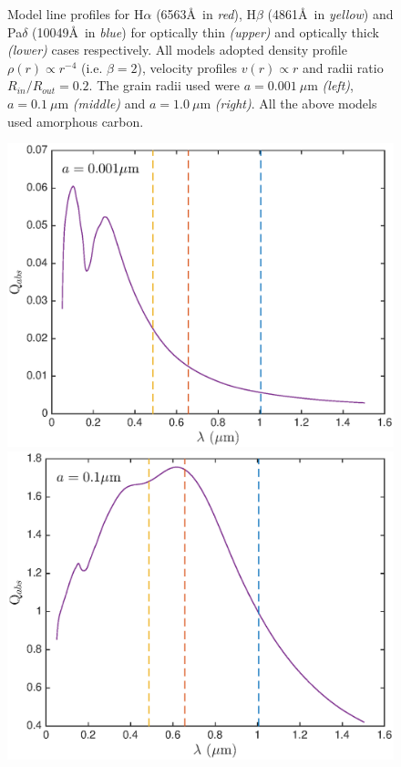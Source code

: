 \documentclass[useAMS,usenatbib,usegraphicx]{mnras}
\begin{document}
\begin{figure}
\caption{Model line profiles for H$\alpha$ (6563\AA\ in \textit{red}), H$\beta$ (4861\AA\ in \textit{yellow}) and Pa$\delta$ (10049\AA\ in \textit{blue}) for optically thin \textit{(upper)} and  optically thick \textit{(lower)} cases respectively.  All models adopted density profile $\rho(r) \propto r^{-4}$ (i.e. $\beta = 2$), velocity profiles $v(r) \propto r$ and radii ratio $R_{in}/R_{out}=0.2$.  The grain radii used were $a=0.001~\mu$m \textit{(left)}, $a=0.1~\mu$m \textit{(middle)} and $a=1.0~\mu$m \textit{(right)}. All the above models used amorphous carbon.}
\label{wav_dep}
\end{figure}

\begin{figure}
\includegraphics[trim =30 10 45 15,clip=true,scale=0.35]{Qabs_a0_001}
\includegraphics[trim =51 10 45 15,clip=true,scale=0.35]{Qabs_a0_1}

\end{figure}
\end{document}
